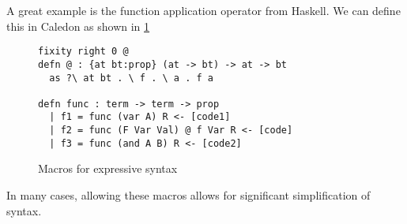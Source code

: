 A great example is the function application operator from Haskell.  
We can define this in Caledon as shown in \ref{code:macros}

\begin{figure}[h]
\begin{lstlisting}
fixity right 0 @
defn @ : {at bt:prop} (at -> bt) -> at -> bt
  as ?\ at bt . \ f . \ a . f a

defn func : term -> term -> prop 
  | f1 = func (var A) R <- [code1]
  | f2 = func (F Var Val) @ f Var R <- [code]
  | f3 = func (and A B) R <- [code2]
\end{lstlisting}
\caption{Macros for expressive syntax}
\label{code:macros}
\end{figure}

In many cases, allowing these macros allows for significant simplification of syntax.
